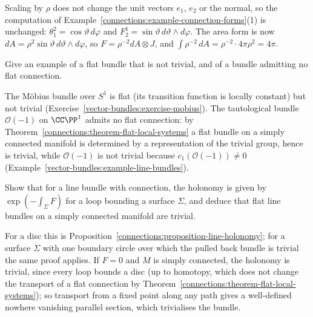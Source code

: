 \begin{solution}
Scaling by $\rho$ does not change the unit vectors $e_1$, $e_2$ or the normal, so the computation of Example~\ref{connections:example-connection-forms}(1) is unchanged:
$\theta^2_1 = \cos\vartheta\,d\varphi$ and $F^1_2 = \sin\vartheta\,d\vartheta \wedge d\varphi$. The area form is now $dA = \rho^2\sin\vartheta\,d\vartheta \wedge d\varphi$, so
$F = \rho^{-2}dA \otimes J$, and $\int\rho^{-2}\,dA = \rho^{-2} \cdot 4\pi\rho^2 = 4\pi$.
\end{solution}

\begin{exercise}\label{connections:exercise-flat-not-trivial}
Give an example of a flat bundle that is not trivial, and of a bundle admitting no flat connection.
\end{exercise}

\begin{solution}
The M\"obius bundle over $S^1$ is flat (its transition function is locally constant) but not trivial
(Exercise~\ref{vector-bundles:exercise-mobius}). The tautological bundle $\mathcal{O}(-1)$ on $\CC\PP^1$ admits no flat connection: by Theorem~\ref{connections:theorem-flat-local-systems} a flat bundle on a
simply connected manifold is determined by a representation of the trivial group, hence is trivial, while $\mathcal{O}(-1)$ is not trivial because $c_1(\mathcal{O}(-1)) \neq 0$
(Example~\ref{vector-bundles:example-line-bundles}).
\end{solution}

\begin{exercise}\label{connections:exercise-holonomy-abelian}
Show that for a line bundle with connection, the holonomy is given by $\exp(-\int_\Sigma F)$ for a loop bounding a surface $\Sigma$, and deduce that flat line bundles on a simply connected manifold are
trivial.
\end{exercise}

\begin{solution}
For a disc this is Proposition~\ref{connections:proposition-line-holonomy}; for a surface $\Sigma$ with one boundary circle over which the pulled back bundle is trivial the same
proof applies. If $F = 0$ and $M$ is simply connected, the holonomy is trivial, since every loop bounds a disc (up to homotopy, which does not change the transport of a flat
connection by Theorem~\ref{connections:theorem-flat-local-systems}); so transport from a fixed point along any path gives a well-defined nowhere vanishing parallel section, which
trivialises the bundle.
\end{solution}

